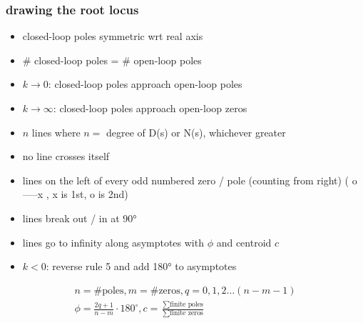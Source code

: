 \subsubsection*{drawing the root locus}
\begin{itemize}
    \item closed-loop poles symmetric wrt real axis
    \item \# closed-loop poles = \# open-loop poles
    \item $k \rightarrow 0$: closed-loop poles approach open-loop poles
    \item $k \rightarrow \infty$: closed-loop poles approach open-loop zeros
    \item $n$ lines where $n =$ degree of D(s) or N(s), whichever greater
    \item no line crosses itself
    \item lines on the left of every odd numbered zero / pole (counting from right) (    o-----x    , x is 1st, o is 2nd)
    \item lines break out / in at 90°
    \item lines go to infinity along asymptotes with $\phi$ and centroid $c$ 
    \item $k < 0$: reverse rule 5 and add 180° to asymptotes
\end{itemize}
\begin{align}
    n = \# \text{poles}, m = \# \text{zeros}, q = 0, 1, 2 \dots (n-m-1)\\
    \phi = \frac{2q + 1}{n-m} \cdot 180^{\circ}, c = \frac{\sum\text{finite poles}}{\sum\text{finite zeros}}
\end{align}
